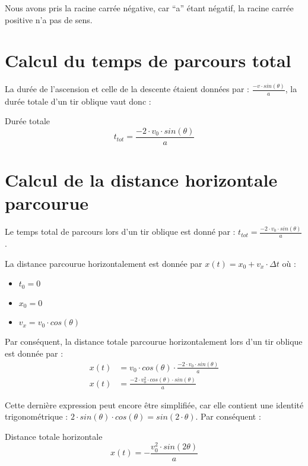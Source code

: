 Nous avons pris la racine carrée négative, car \enquote{a} étant négatif, la racine carrée positive n'a pas de sens.

\section{Calcul du temps de parcours total}
La durée de l'ascension et celle de la descente étaient données par : \(\frac{-v \cdot sin(\theta)}{a}\), la durée totale d'un tir oblique vaut donc :

\begin{encadre_equation*}{Durée totale}
    \begin{equation}
        t_{tot}=\frac{-2 \cdot v_0 \cdot sin(\theta)}{a}
    \end{equation}
\end{encadre_equation*}

\section{Calcul de la distance horizontale parcourue}
Le temps total de parcours lors d'un tir oblique est donné par : \(t_{tot}=\frac{-2 \cdot v_0 \cdot sin(\theta)}{a}\).

La distance parcourue horizontalement est donnée par \(x(t)=x_0+v_x \cdot \Delta t\) où :
\begin{itemize}[label=\textbullet]
    \item \(t_0=0\)
    \item \(x_0=0\)
    \item \(v_x=v_0 \cdot cos(\theta)\)
\end{itemize}

Par conséquent, la distance totale parcourue horizontalement lors d'un tir oblique est donnée par :
\begin{align}
    x(t) & =v_0 \cdot cos(\theta) \cdot \frac{-2 \cdot v_0 \cdot sin(\theta)}{a} \\
    x(t) & =\frac{-2 \cdot v_0^2 \cdot cos(\theta) \cdot sin(\theta)}{a}
\end{align}

Cette dernière expression peut encore être simplifiée, car elle contient une identité trigonométrique : \(2 \cdot sin(\theta) \cdot cos(\theta)=sin(2 \cdot \theta )\).
Par conséquent :
\begin{encadre_equation*}{Distance totale horizontale}
    \begin{equation}
        x(t)=-\frac{v_0^2 \cdot sin(2 \theta)}{a}
    \end{equation}
\end{encadre_equation*}

